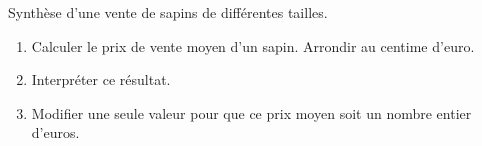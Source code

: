 \begin{exercice*}
    Synthèse d'une vente de sapins de différentes tailles.
    \par\smallskip    
    \smallskip
    \begin{enumerate}
        \item Calculer le prix de vente moyen d'un sapin. Arrondir au centime d'euro.
        \item Interpréter ce résultat.
        \item Modifier une seule valeur pour que ce prix moyen soit un nombre entier d'euros.
    \end{enumerate}
\end{exercice*}

